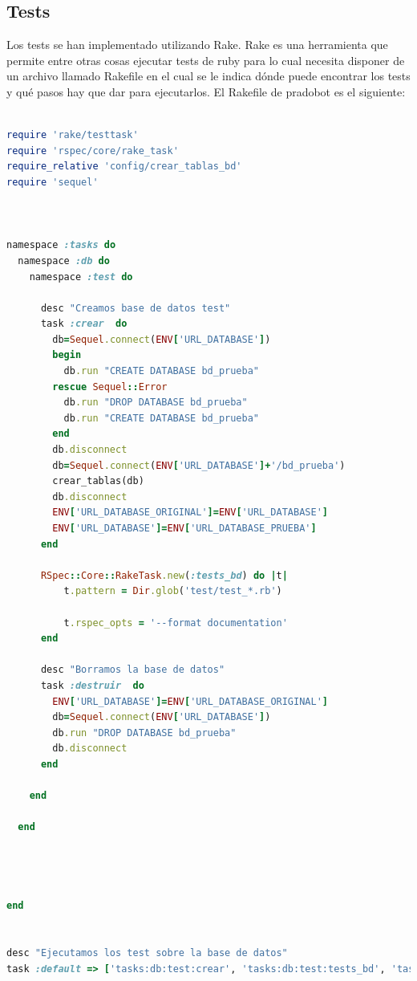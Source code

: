 \subsection{Tests}


Los tests se han implementado utilizando Rake. Rake es una herramienta que permite entre otras cosas ejecutar tests de ruby para lo cual necesita disponer de un archivo llamado Rakefile en el cual se le indica dónde puede encontrar los tests y qué pasos hay que dar para ejecutarlos. El Rakefile de pradobot es el siguiente:

\begin{lstlisting}[language=Ruby]

require 'rake/testtask'
require 'rspec/core/rake_task'
require_relative 'config/crear_tablas_bd'
require 'sequel'



namespace :tasks do
  namespace :db do
    namespace :test do

      desc "Creamos base de datos test"
      task :crear  do
        db=Sequel.connect(ENV['URL_DATABASE'])
        begin
          db.run "CREATE DATABASE bd_prueba"
        rescue Sequel::Error
          db.run "DROP DATABASE bd_prueba"
          db.run "CREATE DATABASE bd_prueba"
        end
        db.disconnect
        db=Sequel.connect(ENV['URL_DATABASE']+'/bd_prueba')
        crear_tablas(db)
        db.disconnect
        ENV['URL_DATABASE_ORIGINAL']=ENV['URL_DATABASE']
        ENV['URL_DATABASE']=ENV['URL_DATABASE_PRUEBA']
      end

      RSpec::Core::RakeTask.new(:tests_bd) do |t|
          t.pattern = Dir.glob('test/test_*.rb')

          t.rspec_opts = '--format documentation'
      end

      desc "Borramos la base de datos"
      task :destruir  do
        ENV['URL_DATABASE']=ENV['URL_DATABASE_ORIGINAL']
        db=Sequel.connect(ENV['URL_DATABASE'])
        db.run "DROP DATABASE bd_prueba"
        db.disconnect
      end

    end

  end




end


desc "Ejecutamos los test sobre la base de datos"
task :default => ['tasks:db:test:crear', 'tasks:db:test:tests_bd', 'tasks:db:test:destruir' ]
\end{lstlisting}

